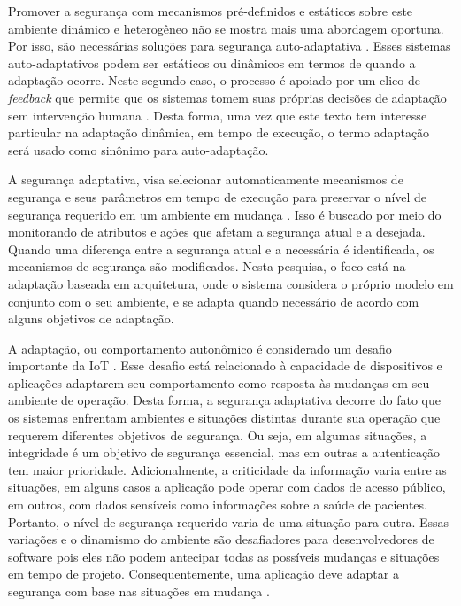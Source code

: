 \documentclass[tid,table]{texufpel} %
\newcommand {\AY} {\todo[inline, color=green]} %
\begin{document}
Promover a segurança com mecanismos pré-definidos e estáticos sobre este ambiente dinâmico e heterogêneo não se mostra mais uma abordagem oportuna. Por isso, são necessárias soluções para segurança auto-adaptativa \cite{evesti13a}. Esses sistemas auto-adaptativos podem ser estáticos ou dinâmicos em termos de quando a adaptação ocorre. Neste segundo caso, o processo é apoiado por um clico de \textit{feedback} que permite que os sistemas tomem suas próprias decisões de adaptação sem intervenção humana \cite{lamprecht12}. Desta forma, uma vez que este texto tem interesse particular na adaptação dinâmica, em tempo de execução, o termo adaptação será usado como sinônimo para auto-adaptação.

A segurança adaptativa, visa selecionar automaticamente mecanismos de segurança e seus parâmetros em tempo de execução para preservar o nível de segurança requerido em um ambiente em mudança \cite{evesti13a}. Isso é buscado  por meio do monitorando de atributos e ações que afetam a segurança atual e a desejada. Quando uma diferença entre a segurança atual e a necessária é identificada, os mecanismos de segurança são modificados. Nesta pesquisa, o foco está na adaptação baseada em arquitetura, onde o sistema considera o próprio modelo em conjunto com o seu ambiente, e se adapta quando necessário de acordo com alguns objetivos de adaptação.

A adaptação, ou comportamento autonômico é considerado um desafio importante da IoT \cite{aman16, alaba17, gartnerttrends17}. Esse desafio está relacionado à capacidade de dispositivos e aplicações adaptarem seu comportamento como resposta às mudanças em seu ambiente de operação. Desta forma, a segurança adaptativa decorre do fato que os sistemas enfrentam ambientes e situações distintas durante sua operação que requerem diferentes objetivos de segurança. Ou seja, em algumas situações, a integridade é um objetivo de segurança essencial, mas em outras a autenticação tem maior prioridade. Adicionalmente, a criticidade da informação varia entre as situações, em alguns casos a aplicação pode operar com dados de acesso público, em outros, com dados sensíveis como informações sobre a saúde de pacientes. Portanto, o nível de segurança requerido varia de uma situação para outra. Essas variações e o dinamismo do ambiente são desafiadores para desenvolvedores de software pois eles não podem antecipar todas as possíveis mudanças e situações em tempo de projeto. Consequentemente, uma aplicação deve adaptar a segurança com base nas situações em mudança \cite{evesti13a}.
\end{document}
